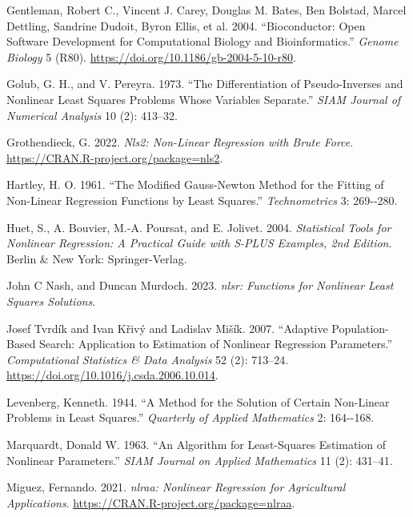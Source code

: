 \begin{CSLReferences}{1}{0}
\leavevmode{}%
Gentleman, Robert C., Vincent J. Carey, Douglas M. Bates, Ben Bolstad, Marcel Dettling, Sandrine Dudoit, Byron Ellis, et al. 2004. {``Bioconductor: Open Software Development for Computational Biology and Bioinformatics.''} \emph{{Genome Biology}} 5 (R80). \url{https://doi.org/10.1186/gb-2004-5-10-r80}.

\leavevmode{}%
Golub, G. H., and V. Pereyra. 1973. {``The Differentiation of Pseudo-Inverses and Nonlinear Least Squares Problems Whose Variables Separate.''} \emph{SIAM Journal of Numerical Analysis} 10 (2): 413--32.

\leavevmode{}%
Grothendieck, G. 2022. \emph{Nls2: Non-Linear Regression with Brute Force}. \url{https://CRAN.R-project.org/package=nls2}.

\leavevmode{}%
Hartley, H. O. 1961. {``The Modified Gauss-Newton Method for the Fitting of Non-Linear Regression Functions by Least Squares.''} \emph{Technometrics} 3: 269-\/-280.

\leavevmode{}%
Huet, S., A. Bouvier, M.-A. Poursat, and E. Jolivet. 2004. \emph{Statistical Tools for Nonlinear Regression: A Practical Guide with {S-PLUS} Examples, 2nd Edition}. Berlin \& New York: Springer-Verlag.

\leavevmode{}%
John C Nash, and Duncan Murdoch. 2023. \emph{{nlsr: Functions for Nonlinear Least Squares Solutions}}.

\leavevmode{}%
Josef Tvrdík and Ivan Křivý and Ladislav Mišík. 2007. {``Adaptive Population-Based Search: Application to Estimation of Nonlinear Regression Parameters.''} \emph{{Computational Statistics \& Data Analysis}} 52 (2): 713--24. \url{https://doi.org/10.1016/j.csda.2006.10.014}.

\leavevmode{}%
Levenberg, Kenneth. 1944. {``A Method for the Solution of Certain Non-Linear Problems in Least Squares.''} \emph{Quarterly of Applied Mathematics} 2: 164-\/-168.

\leavevmode{}%
Marquardt, Donald W. 1963. {``{An Algorithm for Least-Squares Estimation of Nonlinear Parameters}.''} \emph{SIAM Journal on Applied Mathematics} 11 (2): 431--41.

\leavevmode{}%
Miguez, Fernando. 2021. \emph{{nlraa: Nonlinear Regression for Agricultural Applications}}. \url{https://CRAN.R-project.org/package=nlraa}.


\end{CSLReferences}
